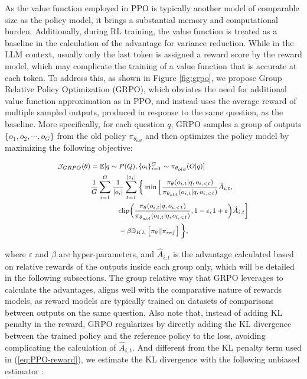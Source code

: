 \begin{itemize}[topsep=0pt]
\begin{itemize}[topsep=0pt]
As the value function employed in PPO is typically another model of comparable size as the policy model, it brings a substantial memory and computational burden. Additionally, during RL training, the value function is treated as a baseline in the calculation of the advantage for variance reduction. While in the LLM context, usually only the last token is assigned a reward score by the reward model, which may complicate the training of a value function that is accurate at each token. To address this, as shown in Figure \ref{fig:grpo}, we propose Group Relative Policy Optimization (GRPO), which obviates the need for additional value function approximation as in PPO, and instead uses the average reward of multiple sampled outputs, produced in response to the same question, as the baseline. More specifically, for each question $q$, GRPO samples a group of outputs $\{o_1, o_2, \cdots, o_G\}$  from the old policy  $\pi_{\theta_{old}}$  and then optimizes the policy model by maximizing the following objective:

\begin{equation}
\footnotesize
\begin{split}
    \mathcal{J}_{GRPO}(\theta) &= \mathbb{E}{[q \sim P(Q), \{o_i\}_{i=1}^G \sim \pi_{\theta_{old}}(O|q)]} \\
    & \frac{1}{G} \sum_{i=1}^G \frac{1}{|o_i|} \sum_{t=1}^{|o_i|} \bigg\{ \min \Big[ \frac{\pi_\theta(o_{i,t} | q, o_{i,<t})}{\pi_{\theta_{old}}(o_{i,t} | q, o_{i,<t})} \hat{A}_{i,t}, \\
    & \qquad\qquad \text{clip} \Big( \frac{\pi_\theta(o_{i,t} | q, o_{i,<t})}{\pi_{\theta_{old}}(o_{i,t} | q, o_{i,<t})}, 1 - \varepsilon, 1 + \varepsilon \Big) \hat{A}_{i,t} \Big] \\
    & \qquad\qquad - \beta \mathbb{D}_{KL}\left[\pi_{\theta} || \pi_{ref}\right] \bigg\} ,
\end{split}
\label{eq:GRPO-obj}
\end{equation}

where $\varepsilon$ and $\beta$ are hyper-parameters, and $\hat{A}_{i,t}$  is the advantage calculated based on relative rewards of the outputs inside each group only, which will be detailed in the following subsections. The group relative way that GRPO leverages to calculate the advantages, aligns well with the comparative nature of rewards models,  as reward models are typically trained on datasets of comparisons between outputs on the same question. Also note that, instead of adding KL penalty in the reward, GRPO regularizes by directly adding the KL divergence between the trained policy and the reference policy to the loss, avoiding complicating the calculation of  $\hat{A}_{i,t}$. And different from the KL penalty term used in (\ref{eq:PPO-reward}), we estimate the KL divergence with the following unbiased estimator \citep{kl_approx}:


\end{itemize}
\end{itemize}
